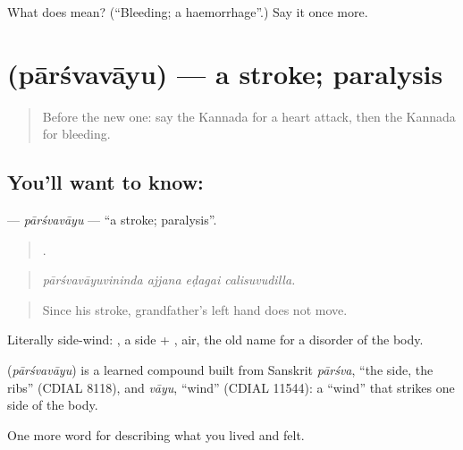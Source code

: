 \begin{tcolorbox}[breakable,colback=teal!4,colframe=teal!35!black,title={Before you move on}]
What does  mean? (\textquotedblleft{}Bleeding; a haemorrhage\textquotedblright{}.) Say it once more.
\end{tcolorbox}
\section[\texorpdfstring{\kn{ಪಾರ್ಶ್ವವಾಯು} (pārśvavāyu)}{ಪಾರ್ಶ್ವವಾಯು (pārśvavāyu)}]{ (pārśvavāyu) — a stroke; paralysis}

\label{lesson:KA-C512-parsvavayu}



\begin{quote}
Before the new one: say the Kannada for a heart attack, then the Kannada for bleeding.
\end{quote}

\subsection*{You'll want to know: }
\textbf{} — \emph{pārśvavāyu} — \textquotedblleft{}a stroke; paralysis\textquotedblright{}.

\begin{quote}
   .
\end{quote}

\begin{quote}
\emph{pārśvavāyuvininda ajjana eḍagai calisuvudilla.}
\end{quote}

\begin{quote}
Since his stroke, grandfather's left hand does not move.
\end{quote}

Literally side-wind: , a side + , air, the old name for a disorder of the body.

\begin{cousinweb}
\textbf{} (\emph{pārśvavāyu}) is a learned compound built from Sanskrit \emph{pārśva}, \textquotedblleft{}the side, the ribs\textquotedblright{} (CDIAL 8118), and \emph{vāyu}, \textquotedblleft{}wind\textquotedblright{} (CDIAL 11544): a \textquotedblleft{}wind\textquotedblright{} that strikes one side of the body.
\end{cousinweb}

\begin{grammarlens}[title={What you've built}]
One more word for describing what you lived and felt.
\end{grammarlens}

